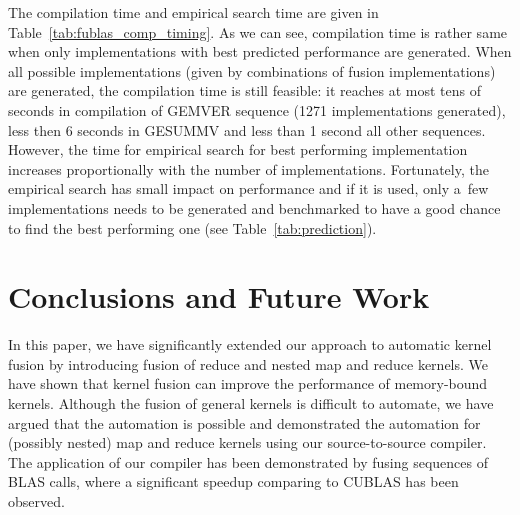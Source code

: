 \documentclass[final]{siamltex}
\begin{document}
{The compilation time and empirical search time are given in Table~\ref{tab:fublas_comp_timing}. As we can see, compilation time is rather same when only implementations with best predicted performance are generated. When all possible implementations (given by combinations of fusion implementations) are generated, the compilation time is still feasible: it reaches at most tens of seconds in compilation of GEMVER sequence (1271 implementations generated), less then 6 seconds in GESUMMV and less than 1 second all other sequences. However, the time for empirical search for best performing implementation increases proportionally with the number of implementations. Fortunately, the empirical search has small impact on performance and if it is used, only a~few implementations needs to be generated and benchmarked to have a good chance to find the best performing one (see Table~\ref{tab:prediction}).


\section{Conclusions and Future Work}
\label{sect:conclusion}

In this paper, we have significantly extended our approach to automatic kernel fusion by introducing fusion of reduce and nested map and reduce kernels. We have shown that kernel fusion can improve the performance of memory-bound kernels. Although the fusion of general kernels is difficult to automate, we have argued that the automation is possible and demonstrated the automation for (possibly nested) map and reduce kernels using our source-to-source compiler. The application of our compiler has been demonstrated by fusing sequences of BLAS calls, where a significant speedup comparing to CUBLAS has been observed.

}
\end{document}
